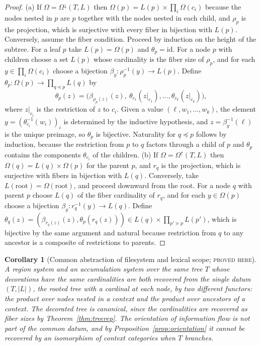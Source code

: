 \documentclass[11pt]{article}
\newtheorem{corollary}[theorem]{Corollary}
\theoremstyle{definition}
\theoremstyle{remark}
\newcommand{\stN}{\textsc{proved here}}
\newcommand{\id}{\mathrm{id}}
\begin{document}
\begin{proof}
(a) If $\Omega=\Omega^{\downarrow}(T,L)$ then $\Omega(p)=L(p)\times\prod_i\Omega(c_i)$ because the nodes nested in $p$ are $p$ together with the nodes nested in each child, and $\rho_p$ is the projection, which is surjective with every fiber in bijection with $L(p)$. Conversely, assume the fiber condition. Proceed by induction on the height of the subtree. For a leaf $p$ take $L(p)=\Omega(p)$ and $\theta_p=\id$. For a node $p$ with children choose a set $L(p)$ whose cardinality is the fiber size of $\rho_p$, and for each $y\in\prod_i\Omega(c_i)$ choose a bijection $\beta_y:\rho_p^{-1}(y)\to L(p)$. Define $\theta_p:\Omega(p)\to\prod_{q\preceq p}L(q)$ by
\[
\theta_p(z)=\bigl(\beta_{\rho_p(z)}(z),\ \theta_{c_1}(z|_{c_1}),\dots,\theta_{c_k}(z|_{c_k})\bigr),
\]
where $z|_{c_i}$ is the restriction of $z$ to $c_i$. Given a value $(\ell,w_1,\dots,w_k)$, the element $y=(\theta_{c_i}^{-1}(w_i))_i$ is determined by the inductive hypothesis, and $z=\beta_y^{-1}(\ell)$ is the unique preimage, so $\theta_p$ is bijective. Naturality for $q\preceq p$ follows by induction, because the restriction from $p$ to $q$ factors through a child of $p$ and $\theta_p$ contains the components $\theta_{c_i}$ of the children. (b) If $\Omega=\Omega^{\uparrow}(T,L)$ then $\Omega(q)=L(q)\times\Omega(p)$ for the parent $p$, and $r_q$ is the projection, which is surjective with fibers in bijection with $L(q)$. Conversely, take $L(\mathrm{root})=\Omega(\mathrm{root})$, and proceed downward from the root. For a node $q$ with parent $p$ choose $L(q)$ of the fiber cardinality of $r_q$, and for each $y\in\Omega(p)$ choose a bijection $\beta_y:r_q^{-1}(y)\to L(q)$. Define $\theta_q(z)=(\beta_{r_q(z)}(z),\theta_p(r_q(z)))\in L(q)\times\prod_{p'\succeq p}L(p')$, which is bijective by the same argument and natural because restriction from $q$ to any ancestor is a composite of restrictions to parents.
\end{proof}

\begin{corollary}[Common abstraction of filesystem and lexical scope; \stN]\label{cor:commonfsscope}
A region system and an accumulation system over the same tree $T$ whose decorations have the same cardinalities are both recovered from the single datum $(T,|L|)$, the rooted tree with a cardinal at each node, by two different functors: the product over nodes nested in a context and the product over ancestors of a context. The decorated tree is canonical, since the cardinalities are recovered as fiber sizes by Theorem~\ref{thm:treerep}. The orientation of information flow is not part of the common datum, and by Proposition~\ref{prop:orientation} it cannot be recovered by an isomorphism of context categories when $T$ branches.
\end{corollary}
\end{document}
